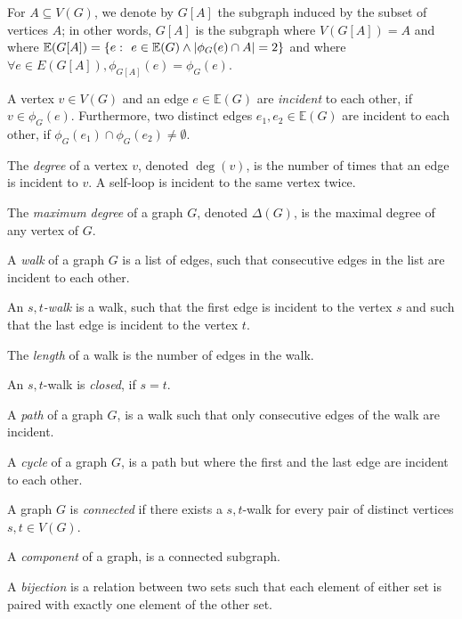 \documentclass{article}
\begin{document}
	For $A \subseteq V(G)$, we denote by $G[A]$ the subgraph induced by the subset of vertices $A$; in other words, $G[A]$ is the subgraph where $V(G[A]) = A$ and where $\mathbb{E}(G[A]) = \{ e \,\colon\  e \in \mathbb{E}(G) \land |\phi_G(e) \cap A| = 2\}$ and where $\forall e \in E(G[A]), \phi_{G[A]}(e) = \phi_{G}(e)$.

	\begin{center}
		
	\end{center}

	A vertex $v \in V(G)$ and an edge $e \in \mathbb{E}(G)$ are \textit{incident} to each other, if $v \in \phi_G(e)$. Furthermore, two distinct edges $e_1,e_2 \in \mathbb{E}(G)$ are incident to each other, if $\phi_G(e_1) \cap \phi_G(e_2) \neq \emptyset$.

	The \textit{degree} of a vertex $v$, denoted $\deg(v)$, is the number of times that an edge is incident to $v$. A self-loop is incident to the same vertex twice.

	\begin{center}
		
	\end{center}

	The \textit{maximum degree} of a graph $G$, denoted $\Delta(G)$, is the maximal degree of any vertex of $G$.

	A \textit{walk} of a graph $G$ is a list of edges, such that consecutive edges in the list are incident to each other.

	An \textit{$s,t$-walk} is a walk, such that the first edge is incident to the vertex $s$ and such that the last edge is incident to the vertex $t$.

	The \textit{length} of a walk is the number of edges in the walk.

	An $s,t$-walk is \textit{closed}, if $s=t$.

	A \textit{path} of a graph $G$, is a walk such that only consecutive edges of the walk are incident.

	A \textit{cycle} of a graph $G$, is a path but where the first and the last edge are incident to each other.

	A graph $G$ is \textit{connected} if there exists a $s,t$-walk for every pair of distinct vertices $s,t \in V(G)$.

	A \textit{component} of a graph, is a connected subgraph.

	A \textit{bijection} is a relation between two sets such that each element of either set is paired with exactly one element of the other set.
\end{document}
